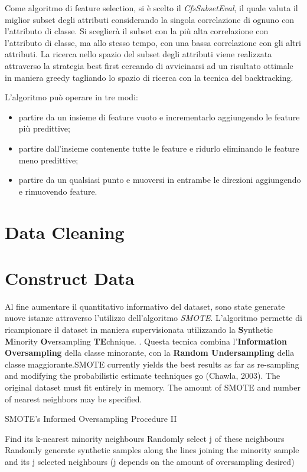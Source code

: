 Come algoritmo di feature selection, si è scelto il \textit{CfsSubsetEval}, il quale valuta il miglior subset degli attributi considerando la singola correlazione di ognuno con l'attributo di classe. Si sceglierà il subset con la più alta correlazione con l'attributo di classe, ma allo stesso tempo, con una bassa correlazione con gli altri attributi. La ricerca nello spazio del subset degli attributi viene realizzata attraverso la strategia best first cercando di avvicinarsi ad un risultato ottimale in maniera greedy tagliando lo spazio di ricerca con la tecnica del backtracking.\cite{Hall1998}

L'algoritmo può operare in tre modi:
\begin{itemize}
	\item partire da un insieme di feature vuoto e incrementarlo aggiungendo le feature più predittive;
	\item partire dall'insieme contenente tutte le feature e ridurlo eliminando le feature meno predittive;
	\item partire da un qualsiasi punto e muoversi in entrambe le direzioni aggiungendo e rimuovendo feature.
\end{itemize}

\section{Data Cleaning}

\section{Construct Data}

Al fine aumentare il quantitativo informativo del dataset, sono state generate nuove istanze attraverso l'utilizzo dell'algoritmo \textit{SMOTE}. L'algoritmo permette di ricampionare il dataset in maniera supervisionata utilizzando la \textbf{S}ynthetic \textbf{M}inority \textbf{O}versampling \textbf{TE}chnique. 
\cite{Chawla02smote:synthetic}. Questa tecnica combina l'\textbf{Information Oversampling} della classe minorante, con la \textbf{Random Undersampling} della classe maggiorante.SMOTE currently yields the best results as far as re-sampling and modifying the probabilistic estimate techniques go (Chawla, 2003).
The original dataset must fit entirely in memory. The amount of SMOTE and number of nearest neighbors may be specified.

\begin{algorithm}
	\caption{SMOTE’s Informed Oversampling Procedure II}
	\begin{algorithmic} 
		\STATE Find its k-nearest minority neighbours
		\STATE Randomly select j of these neighbours
		\STATE Randomly generate synthetic samples along the lines joining the minority sample and its j selected neighbours
		(j depends on the amount of oversampling desired) 
		\ENDFOR
	\end{algorithmic}
\end{algorithm}

